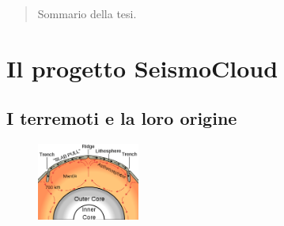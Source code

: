\documentclass[a4paper,10pt]{memoir}
\begin{document}
  
  
\frontmatter


\maketitle
\cleardoublepage




\begin{abstract}
	\thispagestyle{plain}
	Sommario della tesi.
\end{abstract}
\cleardoublepage

\tableofcontents
\cleardoublepage

\mainmatter

\renewcommand\chapterheadstart{}
\renewcommand\printchaptername{}
\renewcommand\chapternamenum{}
\renewcommand\printchapternum{}
\renewcommand\afterchapternum{}
\renewcommand\printchaptertitle[1]{\chaptitlefont \thechapter. \space #1}

\chapter{Il progetto SeismoCloud}

\section{I terremoti e la loro origine}


\begin{figure}
\includegraphics[width=0.30\textwidth]{introduzione/oceanic_spreading}
\end{figure}
\end{document}
